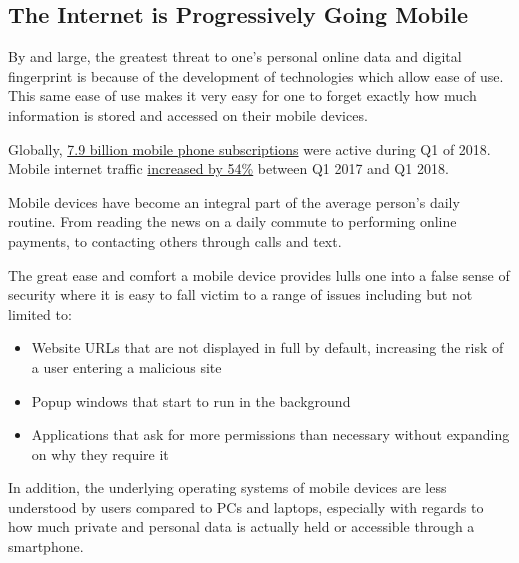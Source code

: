 \subsection{The Internet is Progressively Going Mobile}
By and large, the greatest threat to one's personal online data and digital fingerprint is because of the development of technologies which allow ease of use. This same ease of use makes it very easy for one to forget exactly how much information is stored and accessed on their mobile devices.

Globally, \href{https://www.ericsson.com/en/mobility-report/reports/june-2018/mobile-subscriptions-worldwide-q1-2018}{7.9 billion mobile phone subscriptions} were active during Q1 of 2018. Mobile internet traffic \href{https://www.ericsson.com/en/mobility-report/reports/june-2018/mobile-traffic-report-q1-2018}{increased by 54\%} between Q1 2017 and Q1 2018.

Mobile devices have become an integral part of the average person's daily routine. From reading the news on a daily commute to performing online payments, to contacting others through calls and text. 

The great ease and comfort a mobile device provides lulls one into a false sense of security where it is easy to fall victim to a range of issues including but not limited to:
\begin{itemize}
   \item Website URLs that are not displayed in full by default, increasing the risk of a user entering a malicious site
   \item Popup windows that start to run in the background
   \item Applications that ask for more permissions than necessary without expanding on why they require it
\end{itemize}
In addition, the underlying operating systems of mobile devices are less understood by users compared to PCs and laptops, especially with regards to how much private and personal data is actually held or accessible through a smartphone.
 
